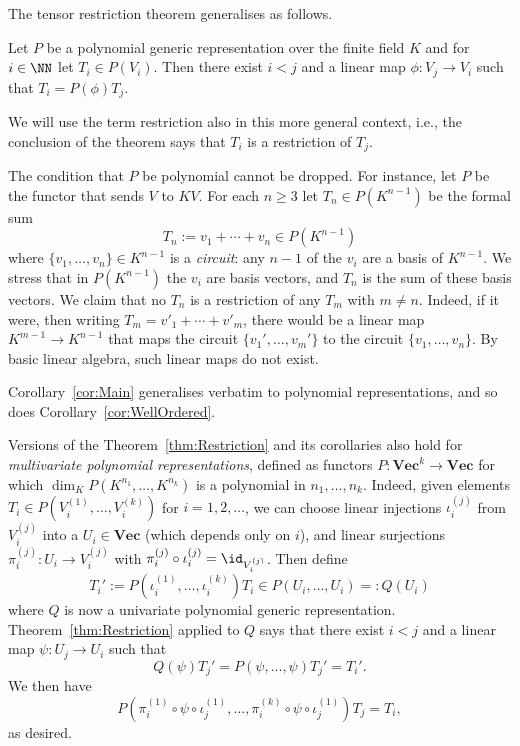 \documentclass{amsart}
\renewcommand{\Vec}{\mathbf{Vec}}
\begin{document}
The tensor restriction theorem generalises as follows. 

\begin{thm} \label{thm:Restriction}
Let $P$ be a polynomial generic representation over the
finite field $K$ and for $i \in \NN$ let
$T_i \in P(V_i)$. Then there exist $i<j$ and a linear map $\phi:V_j \to
V_i$ such that $T_i=P(\phi) T_j$.
\end{thm}

We will use the term restriction also in this more general context, i.e.,
the conclusion of the theorem says that $T_i$ is a restriction of $T_j$.

\begin{re} \label{re:Circuit}
The condition that $P$ be polynomial cannot be dropped. For instance,
let $P$ be the functor that sends $V$ to $KV$. For each $n
\geq 3$ let $T_n \in P(K^{n-1})$ be the formal sum 
\[ T_n:=v_1 + \cdots + v_n \in P(K^{n-1}) \]
where $\{v_1,\ldots,v_n\} \in K^{n-1}$ is a {\em circuit}:
any $n-1$ of the $v_i$ are
a basis of $K^{n-1}$. We stress that in $P(K^{n-1})$
the $v_i$ are basis vectors, and $T_n$ is the sum of these basis
vectors. We claim that no $T_n$ is a restriction of any $T_m$ with $m
\neq n$. Indeed, if it were, then writing $T_m=v'_1 + \cdots + v'_m$,
there would be a linear map $K^{m-1} \to K^{n-1}$ that maps the circuit
$\{v_1',\ldots,v_m'\}$ to the circuit $\{v_1,\ldots,v_n\}$. By basic
linear algebra, such linear maps do not exist.
\end{re}

Corollary~\ref{cor:Main} generalises verbatim to polynomial 
representations, and so does Corollary~\ref{cor:WellOrdered}.

\begin{re} \label{re:Multivariate}
Versions of the Theorem~\ref{thm:Restriction} and its corollaries also hold for
{\em multivariate polynomial representations}, defined as functors
$P:\Vec^k \to \Vec$ for which $\dim_K P(K^{n_1},\ldots,K^{n_k})$
is a polynomial in $n_1,\ldots,n_k$. Indeed, given elements $T_i \in
P(V_i^{(1)},\ldots,V_i^{(k)})$ for $i=1,2,\ldots$, we can choose linear
injections $\iota_i^{(j)}$ from $V_i^{(j)}$ into a $U_i \in \Vec$
(which depends only on $i$), and linear surjections $\pi_i^{(j)}:U_i
\to V_i^{(j)}$ with $\pi_i^{(j)} \circ
\iota_i^{(j)}=\id_{V_i^{(j)}}$. Then define
\[ T_i':=P(\iota_i^{(1)},\ldots,\iota_i^{(k)})T_i \in
P(U_i,\ldots,U_i)=:Q(U_i) \]
where $Q$ is now a univariate polynomial generic representation.
Theorem~\ref{thm:Restriction} applied to $Q$ says that there exist $i<j$
and a linear map $\psi:U_j \to U_i$ such that
\[ Q(\psi)T_j'=P(\psi,\ldots,\psi)T_j'=T_i'. \]
We then have 
\[ P(\pi_i^{(1)} \circ \psi \circ
\iota_j^{(1)},\ldots,\pi_i^{(k)} \circ \psi \circ
\iota_j^{(1)})T_j=T_i, \]
as desired.
\end{re}
\end{document}
